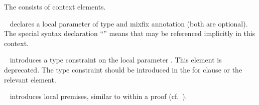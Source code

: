 \begin{isabellebody}
\begin{isamarkuptext}
\begin{description}
  The  consists of context elements.

  \begin{description}

  \item \hyperlink{element.fixes}{\mbox{}}~ declares a local
  parameter of type  and mixfix annotation  (both
  are optional).  The special syntax declaration ``'' means that  may be referenced
  implicitly in this context.

  \item \hyperlink{element.constrains}{\mbox{}}~ introduces a type
  constraint  on the local parameter .  This
  element is deprecated.  The type constraint should be introduced in
  the for clause or the relevant \hyperlink{element.fixes}{\mbox{}} element.

  \item \hyperlink{element.assumes}{\mbox{}}~
  introduces local premises, similar to \hyperlink{command.assume}{\mbox{}} within a
  proof (cf.\ ).


\end{description}
\end{description}
\end{isamarkuptext}
\end{isabellebody}
